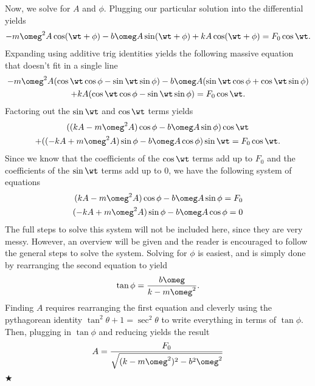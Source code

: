 \noindent Now, we solve for $A$ and $\phi$. Plugging our particular solution into the differential yields
\begin{gather*}
    -m\omeg^2A\cos(\wt +\phi)-b\omeg A\sin(\wt+\phi)+kA\cos(\wt+\phi) = F_0\cos\wt.
\end{gather*}
\noindent Expanding using additive trig identities yields the following massive equation that doesn't fit in a single line
\begin{gather*}
        -m\omeg^2 A(\cos\wt\cos\phi-\sin\wt\sin\phi) - b\omeg A(\sin\wt\cos\phi+\cos\wt\sin\phi)\\+kA(\cos\wt\cos\phi-\sin\wt\sin\phi) = F_0\cos\wt.
\end{gather*}
\noindent Factoring out the $\sin\wt$ and $\cos\wt$ terms yields
\begin{gather*}
    ((kA-m\omeg^2A)\cos\phi - b\omeg A\sin\phi)\cos\wt \\+ ((-kA+m\omeg^2A)\sin\phi - b\omeg A\cos\phi)\sin\wt = F_0\cos\wt.
\end{gather*}
\noindent Since we know that the coefficients of the $\cos\wt$ terms add up to $F_0$ and the coefficients of the $\sin\wt$ terms add up to $0$, we have the following system of equations
\begin{align}
    (kA-m\omeg^2A)\cos\phi - b\omeg A\sin\phi = F_0 \\
    (-kA+m\omeg^2A)\sin\phi - b\omeg A\cos\phi = 0
\end{align}
\noindent The full steps to solve this system will not be included here, since they are very messy. However, an overview will be given and the reader is encouraged to follow the general steps to solve the system. Solving for $\phi$ is easiest, and is simply done by rearranging the second equation to yield
\begin{equation}
    \tan\phi = \frac{b\omeg}{k-m\omeg^2}.
\end{equation}
\noindent Finding $A$ requires rearranging the first equation and cleverly using the pythagorean identity $\tan^2\theta + 1 =\sec^2\theta$ to write everything in terms of $\tan\phi$. Then, plugging in $\tan\phi$ and reducing yields the result
\begin{equation}
    A = \frac{F_0}{\sqrt{(k-m\omeg^2)^2-b^2\omeg^2}}
\end{equation}
$\bigstar$

\newpage

%
%
%
%

